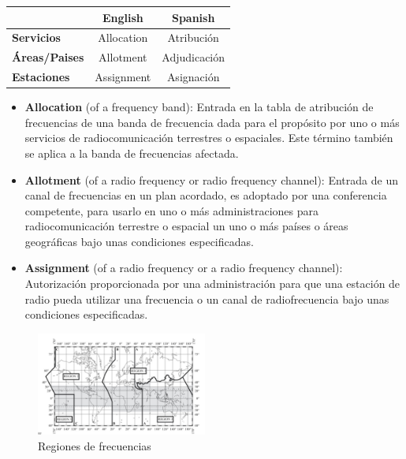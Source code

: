 \documentclass[10pt,portrait, twocolumn]{article}
\begin{document}
\begin{center}
\begin{tabular}{l|c|c|}
\cline{2-3}
                                            & \textbf{English} & \textbf{Spanish} \\ \hline
\multicolumn{1}{|l|}{\textbf{Servicios}}    & Allocation       & Atribución       \\ \hline
\multicolumn{1}{|l|}{\textbf{Áreas/Paises}} & Allotment        & Adjudicación     \\ \hline
\multicolumn{1}{|l|}{\textbf{Estaciones}}   & Assignment       & Asignación       \\ \hline
\end{tabular}
\end{center}

\begin{itemize}
	\item \textbf{Allocation} (of a frequency band): Entrada en la tabla de atribución de frecuencias de una banda de frecuencia dada para el propósito por uno o más servicios de radiocomunicación terrestres o espaciales. Este término también se aplica a la banda de frecuencias afectada.
	\item \textbf{Allotment} (of a radio frequency or radio frequency channel): Entrada de un canal de frecuencias en un plan acordado, es adoptado por una conferencia competente, para usarlo en uno o más administraciones para radiocomunicación terrestre o espacial un uno o más países o áreas geográficas bajo unas condiciones especificadas.
	\item \textbf{Assignment} (of a radio frequency or a radio frequency channel): Autorización proporcionada por una administración para que una estación de radio pueda utilizar una frecuencia o un canal de radiofrecuencia bajo unas condiciones especificadas.
\end{itemize}

\begin{figure}[h]
	\centering
     \includegraphics[width=0.5\textwidth]{Regiones}
      \caption{Regiones de frecuencias}
      \label{fig:Regiones de frecuencias}
  \end{figure}
\end{document}
